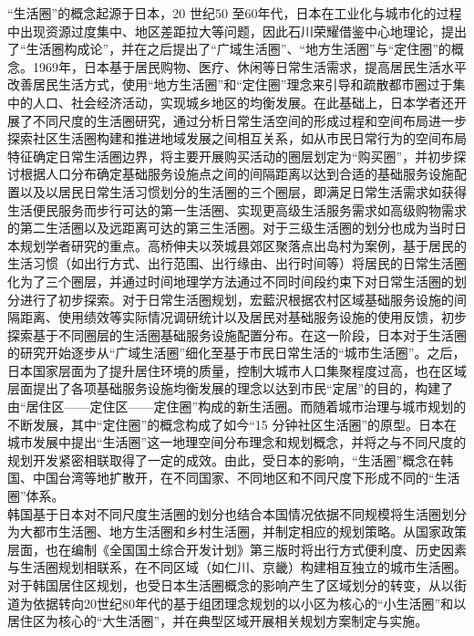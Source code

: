 \documentclass{shnuthesis}
\begin{document}
“生活圈”的概念起源于日本，20 世纪50 至60年代，日本在工业化与城市化的过程中出现资源过度集中、地区差距拉大等问题，因此石川荣耀借鉴中心地理论，提出了“生活圈构成论”，并在之后提出了“广域生活圈”、“地方生活圈”与“定住圈”的概念\textsuperscript{\cite{sun2018}}。1969年，日本基于居民购物、医疗、休闲等日常生活需求，提高居民生活水平改善居民生活方式，使用“地方生活圈”和“定住圈”理念来引导和疏散都市圈过于集中的人口、社会经济活动，实现城乡地区的均衡发展。在此基础上，日本学者还开展了不同尺度的生活圈研究，通过分析日常生活空间的形成过程和空间布局进一步探索社区生活圈构建和推进地域发展之间相互关系，如从市民日常行为的空间布局特征确定日常生活圈边界，将主要开展购买活动的圈层划定为“购买圈”，并初步探讨根据人口分布确定基础服务设施点之间的间隔距离以达到合适的基础服务设施配置\textsuperscript{\cite{boduojiangjianlang1961}}以及以居民日常生活习惯划分的生活圈的三个圈层，即满足日常生活需求如获得生活便民服务而步行可达的第一生活圈、实现更高级生活服务需求如高级购物需求的第二生活圈以及远距离可达的第三生活圈。对于三级生活圈的划分也成为当时日本规划学者研究的重点。高桥伸夫以茨城县郊区聚落点出岛村为案例，基于居民的生活习惯（如出行方式、出行范围、出行缘由、出行时间等）将居民的日常生活圈化为了三个圈层，并通过时间地理学方法通过不同时间段约束下对日常生活圈的划分进行了初步探索\textsuperscript{\cite{takahashi1987}}。对于日常生活圈规划，宏藍沢根据农村区域基础服务设施的间隔距离、使用绩效等实际情况调研统计以及居民对基础服务设施的使用反馈，初步探索基于不同圈层的生活圈基础服务设施配置分布\textsuperscript{\cite{hong1983}}。在这一阶段，日本对于生活圈的研究开始逐步从“广域生活圈”细化至基于市民日常生活的“城市生活圈”。之后，日本国家层面为了提升居住环境的质量，控制大城市人口集聚程度过高，也在区域层面提出了各项基础服务设施均衡发展的理念以达到市民“定居”的目的，构建了由“居住区——定住区——定住圈”构成的新生活圈\textsuperscript{\cite{he2004}}。而随着城市治理与城市规划的不断发展，其中“定住圈”的概念构成了如今“15 分钟社区生活圈”的原型。日本在城市发展中提出“生活圈”这一地理空间分布理念和规划概念，并将之与不同尺度的规划开发紧密相联取得了一定的成效。由此，受日本的影响，“生活圈”概念在韩国、中国台湾等地扩散开，在不同国家、不同地区和不同尺度下形成不同的“生活圈”体系。\\
\indent 韩国基于日本对不同尺度生活圈的划分也结合本国情况依据不同规模将生活圈划分为大都市生活圈、地方生活圈和乡村生活圈，并制定相应的规划策略。从国家政策层面，也在编制《全国国土综合开发计划》第三版时将出行方式便利度、历史因素与生活圈规划相联系，在不同区域（如仁川、京畿）构建相互独立的城市生活圈。对于韩国居住区规划，也受日本生活圈概念的影响产生了区域划分的转变，从以街道为依据转向20世纪80年代的基于组团理念规划的以小区为核心的“小生活圈”和以居住区为核心的“大生活圈”，并在典型区域开展相关规划方案制定与实施\textsuperscript{\cite{zhu2009}}。\\
\end{document}
